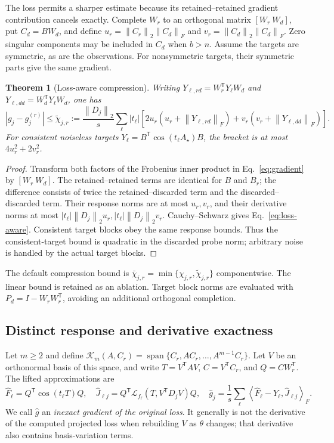 \documentclass[10pt,letterpaper,twoside]{article}
\newcommand{\norm}[1]{\left\lVert #1\right\rVert}
\newcommand{\ip}[2]{\left\langle #1,#2\right\rangle_F}
\newcommand{\Lfrechet}{\mathcal{L}}
\newcommand{\Krylov}{\mathcal{K}}
\newcommand{\Fhat}{\widehat F}
\newcommand{\ghat}{\widehat g}
\newtheorem{theorem}{Theorem}
\begin{document}
The loss permits a sharper estimate because its retained--retained gradient
contribution cancels exactly. Complete $W_r$ to an orthogonal matrix
$[W_r\ W_d]$, put $C_d=BW_d$, and define
$u_r=\norm{C_r}_2\norm{C_d}_F$ and
$v_r=\norm{C_d}_2\norm{C_d}_F$. Zero singular components may be included in
$C_d$ when $b>n$. Assume the targets are symmetric, as are the observations.
For nonsymmetric targets, their symmetric parts give the same gradient.
\begin{theorem}[Loss-aware compression]
Writing $Y_{\ell,rd}=W_r^{\mathsf T}Y_\ell W_d$ and
$Y_{\ell,dd}=W_d^{\mathsf T}Y_\ell W_d$, one has
\begin{equation}
 |g_j-g_j^{(r)}|\le \widetilde\chi_{j,r}:=
 \frac{\norm{D_j}_2}{s}\sum_\ell |t_\ell|
 \left[2u_r(u_r+\norm{Y_{\ell,rd}}_F)
 +v_r(v_r+\norm{Y_{\ell,dd}}_F)\right].
 \label{eq:loss-aware}
\end{equation}
For consistent noiseless targets $Y_\ell=B^{\mathsf T}\cos(t_\ell A_\star)B$,
the bracket is at most $4u_r^2+2v_r^2$.
\end{theorem}
\begin{proof}
Transform both factors of the Frobenius inner product in
Eq.~\eqref{eq:gradient} by $[W_r\ W_d]$. The retained--retained terms are
identical for $B$ and $B_r$; the difference consists of twice the
retained--discarded term and the discarded--discarded term. Their response
norms are at most $u_r,v_r$, and their derivative norms at most
$|t_\ell|\norm{D_j}_2u_r,|t_\ell|\norm{D_j}_2v_r$. Cauchy--Schwarz gives
Eq.~\eqref{eq:loss-aware}. Consistent target blocks obey the same response
bounds. Thus the consistent-target bound is quadratic in the discarded
probe norm; arbitrary noise is handled by the actual target blocks.
\end{proof}
The default compression bound is
$\bar\chi_{j,r}=\min\{\chi_{j,r},\widetilde\chi_{j,r}\}$ componentwise.
The linear bound is retained as an
ablation. Target block norms are evaluated with
$P_d=I-W_rW_r^{\mathsf T}$, avoiding an additional orthogonal completion.

\subsection{Distinct response and derivative exactness}
Let $m\ge2$ and define $\Krylov_m(A,C_r)=\operatorname{span}\{C_r,AC_r,\ldots,A^{m-1}C_r\}$.
Let $V$ be an orthonormal basis of this space, and
write $T=V^{\mathsf T}AV$, $C=V^{\mathsf T}C_r$, and $Q=CW_r^{\mathsf T}$.
The lifted approximations are
\begin{equation}
 \Fhat_\ell=Q^{\mathsf T}\cos(t_\ell T)Q,\quad
 \widehat J_{\ell j}=Q^{\mathsf T}\Lfrechet_{f_\ell}
 (T,V^{\mathsf T}D_jV)Q,\quad
 \ghat_j=\frac1s\sum_\ell\ip{\Fhat_\ell-Y_\ell}{\widehat J_{\ell j}}.
 \label{eq:estimator}
\end{equation}
We call $\ghat$ an \emph{inexact gradient of the original loss}. It generally
is not the derivative of the computed projected loss when rebuilding $V$ as
$\theta$ changes; that derivative also contains basis-variation terms.
\end{document}
